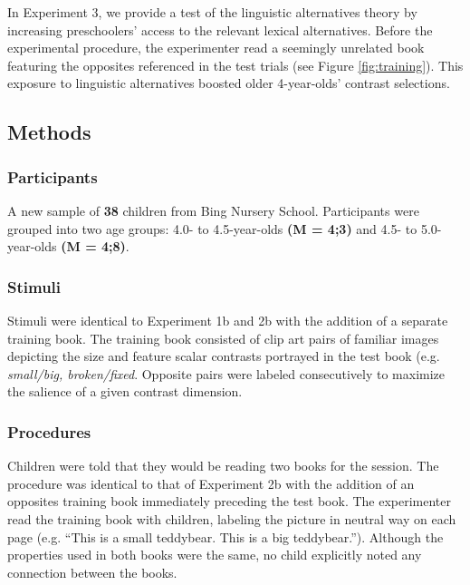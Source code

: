 \documentclass[10pt,letterpaper]{article}
\begin{document}

In Experiment 3, we provide a test of the linguistic alternatives theory by increasing preschoolers' access to the relevant lexical alternatives.  Before the experimental procedure, the experimenter read a seemingly unrelated book featuring the opposites referenced in the test trials (see Figure \ref{fig:training}).  This exposure to linguistic alternatives boosted older 4-year-olds' contrast selections. 

\subsection{Methods}

\subsubsection{Participants}

A new sample of \textbf{38} children from Bing Nursery School. Participants were grouped into two age groups: 4.0- to 4.5-year-olds \textbf{(M = 4;3)} and 4.5- to 5.0-year-olds \textbf{(M = 4;8)}.

\subsubsection{Stimuli}

Stimuli were identical to Experiment 1b and 2b with the addition of a separate training book.  The training book consisted of clip art pairs of familiar images depicting the size and feature scalar contrasts portrayed in the test book (e.g. \emph{small/big, broken/fixed}.  Opposite pairs were labeled consecutively to maximize the salience of a given contrast dimension. 

\subsubsection{Procedures}

Children were told that they would be reading two books for the session.  The procedure was identical to that of Experiment 2b with the addition of an opposites training book immediately preceding the test book. The experimenter read the training book with children, labeling the picture in neutral way on each page (e.g. ``This is a small teddybear. This is a big teddybear.'').  Although the properties used in both books were the same, no child explicitly noted any connection between the books. 
\end{document}
